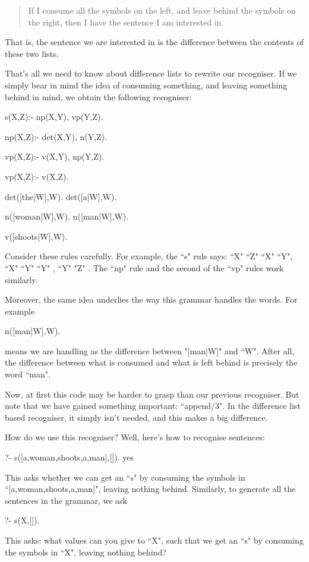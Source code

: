  \begin{quote}
 If I consume all the symbols on the left, and leave
        behind the symbols on the right, then I have the sentence
        I am interested in.
 \end{quote}

That is, the sentence we are interested in is the difference
between the contents of these two lists.



That's all we need to know about difference lists to rewrite our
recogniser. If we simply bear in mind the idea of consuming something,
and leaving something behind in mind, we obtain the following
recogniser:
\begin{LPNcodedisplay}
s(X,Z):- np(X,Y), vp(Y,Z).

np(X,Z):- det(X,Y), n(Y,Z).

vp(X,Z):- v(X,Y), np(Y,Z).

vp(X,Z):- v(X,Z).

det([the|W],W).
det([a|W],W).

n([woman|W],W).
n([man|W],W).

v([shoots|W],W).
\end{LPNcodedisplay}

Consider these rules carefully. For example, the ``s" rule says:
 ``X"  ``Z"
 ``X"  ``Y",  ``X"  ``Y"
 ``Y" ,  ``Y"
"Z" . The  ``np" rule and the
second of the ``vp" rules work similarly.

Moreover, the same idea underlies the way this grammar handles the
words. For example
\begin{LPNcodedisplay}
n([man|W],W).
\end{LPNcodedisplay}
means we are handling  as the difference between
"[man$|$W]" and ``W".  After all, the difference between what is consumed
and what is left behind is precisely the word ``man".

Now, at first this code may be harder to grasp than our previous
recogniser. But note that we have gained something important:
 ``append/3". In the difference list based
recogniser, it simply isn't needed, and this makes a big difference.

How do we use this recogniser? Well, here's how to recognise
sentences:
\begin{LPNcodedisplay}
?- s([a,woman,shoots,a,man],[]).
yes
\end{LPNcodedisplay}
This asks whether we can get an ``s" by consuming the symbols
in ``[a,woman,shoots,a,man]", leaving nothing behind.
Similarly, to generate all the sentences in the grammar,
we ask
\begin{LPNcodedisplay}
?- s(X,[]).
\end{LPNcodedisplay}
This asks: what values can you give to ``X", such that we get an ``s" by
consuming the symbols in ``X", leaving nothing behind?

